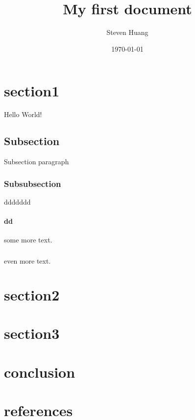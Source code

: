 \documentclass{article}
\title{ My first document}
\date{\today}
\author{Steven Huang}
\begin{document}
\maketitle
\newpage
{}

\section{section1}
Hello World!

\subsection{Subsection}
Subsection paragraph

\subsubsection{Subsubsection}
ddddddd

\paragraph{dd}
some more text.
\subparagraph{}
even more text.

\section{section2}
\section{section3}
\section{conclusion}
\section{references}
\end{document}
